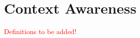         
    
    

    
\section{Context Awareness}



\textcolor{red}{Definitions to be added!}






